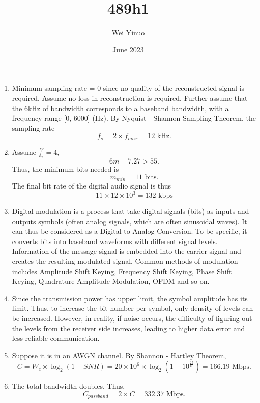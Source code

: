 \documentclass{article}
\title{489h1}
\author{Wei Yinuo}
\date{June 2023}
\begin{document}
\maketitle

\begin{enumerate}
    \item
    Minimum sampling rate = 0 since no quality of the reconstructed signal is required.
    \newline
    Assume no loss in reconstruction is required. Further assume that the 6kHz of bandwidth corresponds to a baseband bandwidth, with a frequency range [0, 6000] (Hz). By Nyquist - Shannon Sampling Theorem, the sampling rate
    $$f_s=2\times f_{max}=12 \text{ kHz}.$$
    
    \item
    Assume $\frac{V}{\delta_x}=4$, $$6m-7.27>55.$$ Thus, the minimum bits needed is $$m_{min}=11 \text{ bits}.$$
    The final bit rate of the digital audio signal is thus
    $$11\times 12\times 10^{3} = 132 \text{ kbps}$$
    \item Digital modulation is a process that take digital signals (bits) as inputs and outputs symbols (often analog signals, which are often sinusoidal waves).
    It can thus be considered as a Digital to Analog Conversion. 
    To be specific, it converts bits into baseband waveforms with different signal levels. Information of the message signal is embedded into the carrier signal and creates the resulting modulated signal.
    Common methods of modulation includes Amplitude Shift Keying, Frequency Shift Keying, Phase Shift Keying, Quadrature Amplitude Modulation, OFDM and so on.
    
    \item Since the transmission power has upper limit, the symbol amplitude has its limit. Thus, to increase the bit number per symbol, only density of levels can be increased. However, in reality, if noise occurs, the difficulty of figuring out the levels from the receiver side increases, leading to higher data error and less reliable communication. 
    
    \item 
    Suppose it is in an AWGN channel. By Shannon - Hartley Theorem,
    $$C=W_c\times \log _2 (1+SNR) = 20 \times 10^6 \times \log _2(1+10^{\frac{25}{10}})=166.19 \text{ Mbps}.$$
    \item
    The total bandwidth doubles. Thus,
    $$C_{passband}=2\times C= 332.37\text{ Mbps}.$$
    

\end{enumerate}
\end{document}

